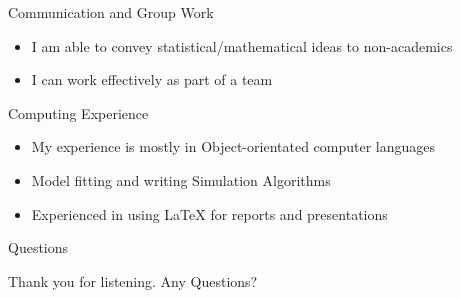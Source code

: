 \documentclass{beamer}
\begin{document}

\begin{frame}{Communication and Group Work}

\begin{itemize}
\item I am able to convey statistical/mathematical ideas to non-academics \vskip 5mm 

\item I can work effectively as part of a team \vskip 5mm

\end{itemize}


\end{frame}


\begin{frame}{Computing Experience}

\begin{itemize}
\item My experience is mostly in Object-orientated computer languages \vskip 5mm

\item Model fitting and writing Simulation Algorithms \vskip 5mm

\item Experienced in using \LaTeX{} for reports and presentations \vskip 5mm 

\end{itemize}

\end{frame}


\begin{frame}{Questions}

\begin{center}
Thank you for listening.
\vskip 0.5cm
Any Questions?

\end{center}

\end{frame}
\end{document}
